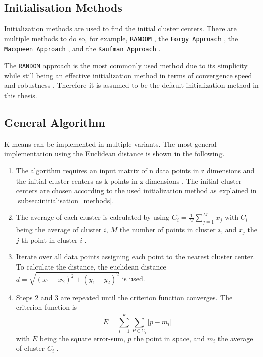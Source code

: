 \subsection{Initialisation Methods}
\label{subsec:initialisation_methods}
Initialization methods are used to find the initial cluster centers.
There are multiple methods to do so, for example, \texttt{RANDOM} \cite{PEN-ECI}, the \texttt{Forgy Approach} \cite{AND-CAA}, the \texttt{Macqueen Approach} \cite{MCQ-MCA}, and the \texttt{Kaufman Approach} \cite{KAU-FGD}.

The \texttt{RANDOM} approach is the most commonly used method due to its simplicity while still being an effective initialization method in terms of convergence speed and robustness \cite{PEN-ECI}.
Therefore it is assumed to be the default initialization method in this thesis.

\subsection{General Algorithm}
\label{subsec:general_algorithm}
K-means can be implemented in multiple variants.
The most general implementation using the Euclidean distance is shown in the following.
\begin{enumerate}
    \item The algorithm requires an input matrix of n data points in z dimensions and the initial cluster centers as k points in z dimensions \cite{HAR-KMA}.
          The initial cluster centers are chosen according to the used initialization method as explained in \autoref{subsec:initialisation_methods}.
    \item The average of each cluster is calculated by using $C_i = \frac{1}{M} \sum_{j=1}^{M}x_j$ with $C_i$ being the average of cluster $i$, $M$ the number of points in cluster $i$, and $x_j$ the $j$-th point in cluster $i$ \cite{SYA-IKC}.
    \item Iterate over all data points assigning each point to the nearest cluster center.
          To calculate the distance, the euclidean distance $d = \sqrt{(x_1-x_2)^2+(y_1-y_2)^2}$ is used.
    \item Steps 2 and 3 are repeated until the criterion function converges.
          The criterion function is \begin{equation}\label{eq:sse}E=\sum_{i=1}^{k} \sum_{P \in C_i}|p-m_i|\end{equation} with $E$ being the square error-sum, $p$ the point in space, and $m_i$ the average of cluster $C_i$ \cite{LIU-BDE}.
\end{enumerate}

